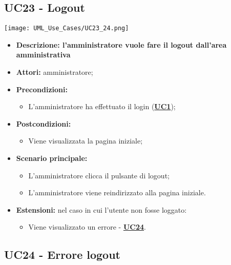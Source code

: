 \subsection{UC23 - Logout}
\label{sec:UC23}
\texttt{[image: UML\_Use\_Cases/UC23\_24.png]}
\begin{itemize}
	\item \textbf{Descrizione: l'amministratore vuole fare il logout dall'area amministrativa} 
	\item \textbf{Attori:} amministratore;
	\item \textbf{Precondizioni:} 
	\begin{itemize}
		\item L’amministratore ha effettuato il login (\hyperref[sec:UC1]{\textbf{UC1}});
	\end{itemize}
	\item \textbf{Postcondizioni:} 
	\begin{itemize}
		\item Viene visualizzata la pagina iniziale;
	\end{itemize}
	\item \textbf{Scenario principale:} 
	\begin{itemize}
		\item L’amministratore clicca il pulsante di logout;
		\item L’amministratore viene reindirizzato alla pagina iniziale.
	\end{itemize}
	\item \textbf{Estensioni:} nel caso in cui l'utente non fosse loggato:
	\begin{itemize}
		\item Viene visualizzato un errore - \hyperref[sec:UC24]{\textbf{UC24}}.
	\end{itemize}
\end{itemize}

\subsection{UC24 - Errore logout}
\label{sec:UC24}

